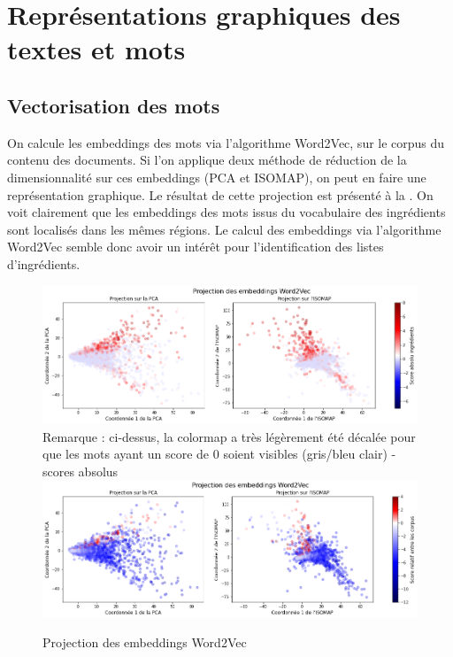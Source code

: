         \section{Représentations graphiques des textes et mots}

            \subsection{Vectorisation des mots}

            On calcule les embeddings des mots via l'algorithme Word2Vec, sur le corpus du contenu des documents.
            Si l'on applique deux méthode de réduction de la dimensionnalité sur ces embeddings (PCA et ISOMAP), on peut en faire une représentation graphique.
            Le résultat de cette projection est présenté à la .
            On voit clairement que les embeddings des mots issus du vocabulaire des ingrédients sont localisés dans les mêmes régions.
            Le calcul des embeddings via l'algorithme Word2Vec semble donc avoir un intérêt pour l'identification des listes d'ingrédients. 

            \begin{figure}[htbp]
                \begin{center}
                \includegraphics[width=0.9\linewidth]{img/word2vec_projection.png}
                Remarque : ci-dessus, la colormap a très légèrement été décalée pour que les mots ayant un score de 0 soient visibles (gris/bleu clair) - scores absolus
                \bigskip
                \includegraphics[width=0.9\linewidth]{img/word2vec_projection_relative.png}
                \end{center}
                \caption{Projection des embeddings Word2Vec}
                \label{fig:word2vec_projection}
            \end{figure}            

